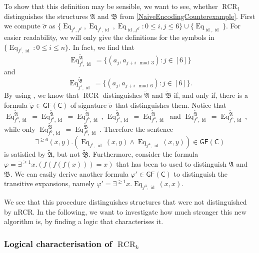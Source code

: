 \documentclass[a4paper,11pt,DIV=15]{scrartcl} %
\renewcommand{\phi}{\varphi}
\theoremstyle{plain}
\theoremstyle{definition}
\newcommand{\GFC}{\mathsf{GF}(\mathsf{C})}
\newcommand{\RCR}{\operatorname{RCR}}
\begin{document}
To show that this definition may be sensible, we want to see, whether $\RCR_1$ distinguishes the structures $\mathfrak A$ and $\mathfrak B$ from \cref{NaiveEncodingCounterexample}.
First we compute $\widetilde\sigma$ as $\{\operatorname{Eq}_{f^i,f^j}, \operatorname{Eq}_{f^i,\operatorname{id}}, \operatorname{Eq}_{\operatorname{id},f^j} : 0\leq i,j \leq 6\}\cup\{\operatorname{Eq}_{\operatorname{id},\operatorname{id}}\}$. 
For easier readability, we will only give the definitions for the symbols in $\{\operatorname{Eq}_{f^i,\operatorname{id}} : 0 \leq i \leq n\}$. 
In fact, we find that 
$$\operatorname{Eq}_{f^i,\operatorname{id}}^{\widetilde{\mathfrak A}} = \{(a_j,a_{j+i \mod 3}) : j \in [6]\}$$
and 
$$\operatorname{Eq}_{f^i,\operatorname{id}}^{\widetilde{\mathfrak B}} = \{(a_j,a_{j+i \mod 6}) : j \in [6]\}.$$
By using \cite{scheidt2025ColorRefinement}, we know that $\RCR$ distinguishes $\widetilde{\mathfrak A}$ and $\widetilde{\mathfrak B}$ if, and only if, there is a formula $\widetilde{\phi}\in\GFC$ of signature $\widetilde{\sigma}$ that distinguishes them.
Notice that $\operatorname{Eq}_{f^0,\operatorname{id}}^{\widetilde{\mathfrak A}}=\operatorname{Eq}_{f^3,\operatorname{id}}^{\widetilde{\mathfrak A}}=\operatorname{Eq}_{f^6,\operatorname{id}}^{\widetilde{\mathfrak A}}$, $\operatorname{Eq}_{f^1,\operatorname{id}}^{\widetilde{\mathfrak A}}=\operatorname{Eq}_{f^4,\operatorname{id}}^{\widetilde{\mathfrak A}}$ and $\operatorname{Eq}_{f^2,\operatorname{id}}^{\widetilde{\mathfrak A}}=\operatorname{Eq}_{f^5,\operatorname{id}}^{\widetilde{\mathfrak A}}$, while only $\operatorname{Eq}_{f^0,\operatorname{id}}^{\widetilde{\mathfrak B}}=\operatorname{Eq}_{f^6,\operatorname{id}}^{\widetilde{\mathfrak B}}$.
Therefore the sentence 
$$\exists^{\geq 6}(x,y).\left(\operatorname{Eq}_{f^1,\operatorname{id}}(x,y) \land \operatorname{Eq}_{f^4,\operatorname{id}}(x,y)\right)\in \GFC$$ 
is satisfied by $\widetilde{\mathfrak A}$, but not $\widetilde{\mathfrak B}$.
Furthermore, consider the formula $\phi=\exists^{\geq 1} x.(f(f(f(x)))=x)$ that has been to used to distinguish $\mathfrak A$ and $\mathfrak B$.
We can easily derive another formula $\phi'\in \GFC$ to distinguish the transitive expansions, namely $\phi'=\exists^{\geq 1} x. \operatorname{Eq}_{f^3, \operatorname{id}}(x, x)$.

We see that this procedure distinguishes structures that were not distinguished by nRCR.
In the following, we want to investigate how much stronger this new algorithm is, by finding a logic that characterises it.

\subsubsection{Logical characterisation of $\RCR_k$}
\end{document}
